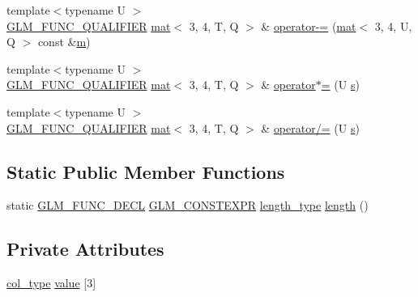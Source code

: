 \begin{DoxyCompactItemize}
{\footnotesize template$<$typename U $>$ }\\\mbox{\hyperlink{setup_8hpp_a33fdea6f91c5f834105f7415e2a64407}{G\+L\+M\+\_\+\+F\+U\+N\+C\+\_\+\+Q\+U\+A\+L\+I\+F\+I\+ER}} \mbox{\hyperlink{structglm_1_1mat}{mat}}$<$ 3, 4, T, Q $>$ \& \mbox{\hyperlink{structglm_1_1mat_3_013_00_014_00_01_t_00_01_q_01_4_a2226def89213f65ec0c850f016191fed}{operator-\/=}} (\mbox{\hyperlink{structglm_1_1mat}{mat}}$<$ 3, 4, U, Q $>$ const \&\mbox{\hyperlink{_s_d_l__opengl__glext_8h_af593500c283bf1a787a6f947f503a5c2}{m}})
\item 
{\footnotesize template$<$typename U $>$ }\\\mbox{\hyperlink{setup_8hpp_a33fdea6f91c5f834105f7415e2a64407}{G\+L\+M\+\_\+\+F\+U\+N\+C\+\_\+\+Q\+U\+A\+L\+I\+F\+I\+ER}} \mbox{\hyperlink{structglm_1_1mat}{mat}}$<$ 3, 4, T, Q $>$ \& \mbox{\hyperlink{structglm_1_1mat_3_013_00_014_00_01_t_00_01_q_01_4_aab8941404df3b9d3243c121f9ba91cc1}{operator$\ast$=}} (U \mbox{\hyperlink{_s_d_l__opengl_8h_a4af680a6c683f88ed67b76f207f2e6e4}{s}})
\item 
{\footnotesize template$<$typename U $>$ }\\\mbox{\hyperlink{setup_8hpp_a33fdea6f91c5f834105f7415e2a64407}{G\+L\+M\+\_\+\+F\+U\+N\+C\+\_\+\+Q\+U\+A\+L\+I\+F\+I\+ER}} \mbox{\hyperlink{structglm_1_1mat}{mat}}$<$ 3, 4, T, Q $>$ \& \mbox{\hyperlink{structglm_1_1mat_3_013_00_014_00_01_t_00_01_q_01_4_ae47ccda80c8464f365fc31bbafb57a17}{operator/=}} (U \mbox{\hyperlink{_s_d_l__opengl_8h_a4af680a6c683f88ed67b76f207f2e6e4}{s}})
\end{DoxyCompactItemize}
\subsection*{Static Public Member Functions}
\begin{DoxyCompactItemize}
\item 
static \mbox{\hyperlink{setup_8hpp_ab2d052de21a70539923e9bcbf6e83a51}{G\+L\+M\+\_\+\+F\+U\+N\+C\+\_\+\+D\+E\+CL}} \mbox{\hyperlink{setup_8hpp_a08b807947b47031d3a511f03f89645ad}{G\+L\+M\+\_\+\+C\+O\+N\+S\+T\+E\+X\+PR}} \mbox{\hyperlink{structglm_1_1mat_3_013_00_014_00_01_t_00_01_q_01_4_a6a07c3870b8e6d4ba5f1ec8fa988d9bf}{length\+\_\+type}} \mbox{\hyperlink{structglm_1_1mat_3_013_00_014_00_01_t_00_01_q_01_4_aee79c3b80a64a53f025f031a01280a35}{length}} ()
\end{DoxyCompactItemize}
\subsection*{Private Attributes}
\begin{DoxyCompactItemize}
\item 
\mbox{\hyperlink{structglm_1_1mat_3_013_00_014_00_01_t_00_01_q_01_4_aaa23c4674cbe2dc1eda1d826b8ef721e}{col\+\_\+type}} \mbox{\hyperlink{structglm_1_1mat_3_013_00_014_00_01_t_00_01_q_01_4_a5565dc4ee500797675a5841e79cf8d3c}{value}} \mbox{[}3\mbox{]}
\end{DoxyCompactItemize}


